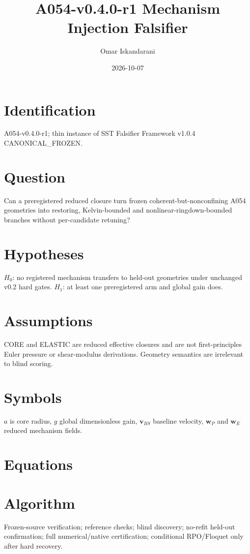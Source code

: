 \documentclass[11pt]{article}
\title{A054-v0.4.0-r1 Mechanism Injection Falsifier}\author{Omar Iskandarani}\date{2026-10-07}
\begin{document}
\maketitle
\section{Identification} A054-v0.4.0-r1; thin instance of SST Falsifier Framework v1.0.4 CANONICAL\_FROZEN.
\section{Question} Can a preregistered reduced closure turn frozen coherent-but-nonconfining A054 geometries into restoring, Kelvin-bounded and nonlinear-ringdown-bounded branches without per-candidate retuning?
\section{Hypotheses} $H_0$: no registered mechanism transfers to held-out geometries under unchanged v0.2 hard gates. $H_1$: at least one preregistered arm and global gain does.
\section{Assumptions} CORE and ELASTIC are reduced effective closures and are not first-principles Euler pressure or shear-modulus derivations. Geometry semantics are irrelevant to blind scoring.
\section{Symbols} $a$ is core radius, $g$ global dimensionless gain, $\mathbf v_{BS}$ baseline velocity, $\mathbf w_P$ and $\mathbf w_E$ reduced mechanism fields.
\section{Equations}
\section{Algorithm} Frozen-source verification; reference checks; blind discovery; no-refit held-out confirmation; full numerical/native certification; conditional RPO/Floquet only after hard recovery.
\end{document}
